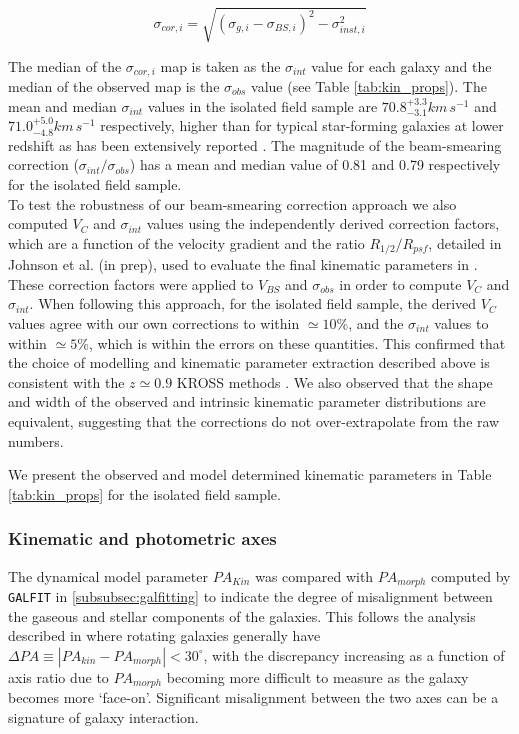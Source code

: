 \documentclass[fleqn,usenatbib]{mnras}
\begin{document}
\begin{equation}\label{eq:owen_sigma}
\sigma_{cor,i} = \sqrt{\left(\sigma_{g,i} - \sigma_{BS,i}\right)^{2} - \sigma_{inst,i}^{2}}
\end{equation}

\noindent
The median of the $\sigma_{cor,i}$ map is taken as the $\sigma_{int}$ value for each galaxy and the median of the observed map is the $\sigma_{obs}$ value (see Table \ref{tab:kin_props}).
The mean and median $\sigma_{int}$ values in the isolated field sample are $70.8^{+3.3}_{-3.1} km\,s^{-1}$ and $71.0^{+5.0}_{-4.8} km\,s^{-1}$ respectively, higher than for typical star-forming galaxies at lower redshift as has been extensively reported \citep[e.g.][]{Genzel2006,Genzel2008,ForsterSchreiber2009,Law2009,Gnerucci2011,Epinat2012,Wisnioski2015}.
The magnitude of the beam-smearing correction ($\sigma_{int}/\sigma_{obs}$) has a mean and median value of 0.81 and 0.79 respectively for the isolated field sample. \\

\noindent
To test the robustness of our beam-smearing correction approach we also computed $V_{C}$ and $\sigma_{int}$ values using the independently derived correction factors, which are a function of the velocity gradient and the ratio $R_{1/2}/R_{psf}$, detailed in Johnson et al. (in prep), used to evaluate the final kinematic parameters in \cite{Harrison2017}.
These correction factors were applied to $V_{BS}$ and $\sigma_{obs}$ in order to compute $V_{C}$ and $\sigma_{int}$.
When following this approach, for the isolated field sample, the derived $V_{C}$ values agree with our own corrections to within $\simeq10\%$, and the $\sigma_{int}$ values to within $\simeq5\%$, which is within the errors on these quantities. 
This confirmed that the choice of modelling and kinematic parameter extraction described above is consistent with the $z\simeq0.9$ KROSS methods \citep{Harrison2017}.
We also observed that the shape and width of the observed and intrinsic kinematic parameter distributions are equivalent, suggesting that the corrections do not over-extrapolate from the raw numbers.

We present the observed and model determined kinematic parameters in Table \ref{tab:kin_props} for the isolated field sample.

\subsubsection{Kinematic and photometric axes}\label{subsubsection:kin_and_phot}
The dynamical model parameter $PA_{Kin}$ was compared with $PA_{morph}$ computed by {\tt GALFIT} in \cref{subsubsec:galfitting} to indicate the degree of misalignment between the gaseous and stellar components of the galaxies.
This follows the analysis described in \citep[e.g.][]{Epinat2008,Epinat2012,Barrera-Ballesteros2014,Barrera-Ballesteros2015,Wisnioski2015,Harrison2017,Swinbank2017} where rotating galaxies generally have $\Delta PA \equiv |PA_{kin}-PA_{morph}| < 30^{\circ}$, with the discrepancy increasing as a function of axis ratio due to $PA_{morph}$ becoming more difficult to measure as the galaxy becomes more `face-on'.
Significant misalignment between the two axes can be a signature of galaxy interaction.
\end{document}
